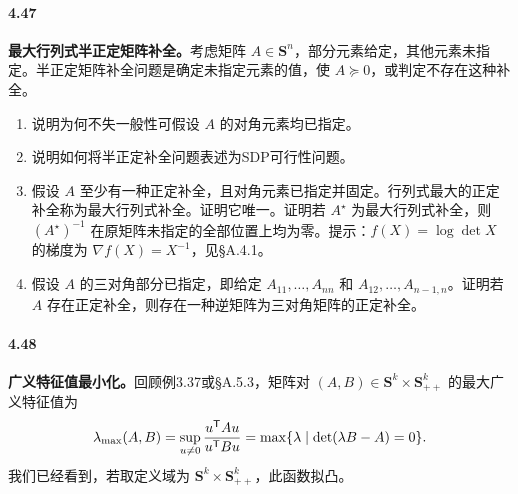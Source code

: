 \paragraph{4.47}\textbf{最大行列式半正定矩阵补全。}考虑矩阵 $A\in\mathbf S^n$，部分元素给定，其他元素未指定。半正定矩阵补全问题是确定未指定元素的值，使 $A\succeq0$，或判定不存在这种补全。
\begin{enumerate}[label=(\alph*)]
\item 说明为何不失一般性可假设 $A$ 的对角元素均已指定。
\item 说明如何将半正定补全问题表述为SDP可行性问题。
\item 假设 $A$ 至少有一种正定补全，且对角元素已指定并固定。行列式最大的正定补全称为最大行列式补全。证明它唯一。证明若 $A^\star$ 为最大行列式补全，则 $(A^\star)^{-1}$ 在原矩阵未指定的全部位置上均为零。提示：$f(X)=\log\det X$ 的梯度为 $\nabla f(X)=X^{-1}$，见§A.4.1。
\item 假设 $A$ 的三对角部分已指定，即给定 $A_{11},\ldots,A_{nn}$ 和 $A_{12},\ldots,A_{n-1,n}$。证明若 $A$ 存在正定补全，则存在一种逆矩阵为三对角矩阵的正定补全。
\end{enumerate}

\paragraph{4.48}\textbf{广义特征值最小化。}回顾例3.37或§A.5.3，矩阵对 $(A,B)\in\mathbf S^k\times\mathbf S_{++}^k$ 的最大广义特征值为
\[
\lambda_{\max}(A,B)=\sup_{u\ne0}\frac{u^\mathsf T Au}{u^\mathsf T Bu}
=\max\{\lambda\mid\det(\lambda B-A)=0\}.
\]
我们已经看到，若取定义域为 $\mathbf S^k\times\mathbf S_{++}^k$，此函数拟凸。
